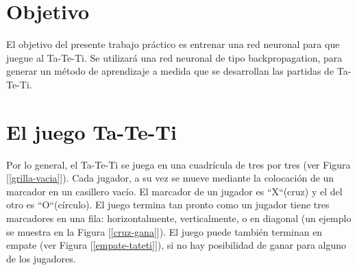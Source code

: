 \documentclass[12pt,titlepage]{article}
\begin{document}


\pagestyle{fancy}
\lhead{}
\chead{}
\rhead{}
\cfoot{}
\rfoot{\\\thepage}
\renewcommand{\headrulewidth}{0pt}



\setcounter{page}{2}

\newpage
\thispagestyle{empty}
\tableofcontents
\newpage



\section{Objetivo}
El objetivo del presente trabajo pr\'actico es entrenar una red neuronal para que juegue al Ta-Te-Ti. Se utilizar\'a una red neuronal de tipo backpropagation, para generar un m\'etodo de aprendizaje a medida que se desarrollan las partidas de Ta-Te-Ti.

\section{El juego Ta-Te-Ti}
Por lo general, el Ta-Te-Ti se juega en una cuadrícula de tres por tres (ver Figura [\ref{grilla-vacia}]). Cada jugador, a su vez se mueve mediante la colocación de un marcador en un casillero vac\'io. El marcador de un jugador es ``X``(cruz) y el del otro es ``O``(c\'irculo). El juego termina tan pronto como un jugador tiene tres marcadores en una fila: horizontalmente, verticalmente, o en diagonal (un ejemplo se muestra en la Figura [\ref{cruz-gana}]). El juego puede también terminan en empate (ver Figura [\ref{empate-tateti}]), si no hay posibilidad de ganar para alguno de los jugadores.
\end{document}
